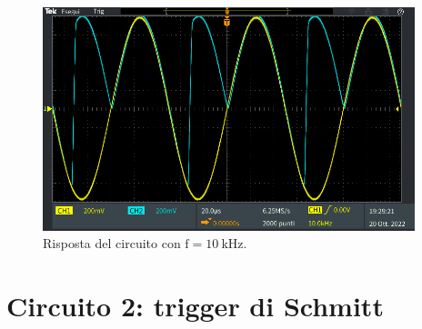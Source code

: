 \documentclass{report}
\begin{document}
\begin{figure}[h!]
	\centering
	\includegraphics[height=6.5cm]{immagini/TEK00008}
	\caption{Risposta del circuito con $\mathrm{f= \SI{10}{k\hertz}}$.}
	\label{figura:uscita12}
\end{figure}
\newpage
\section{Circuito 2: trigger di Schmitt}
\end{document}
